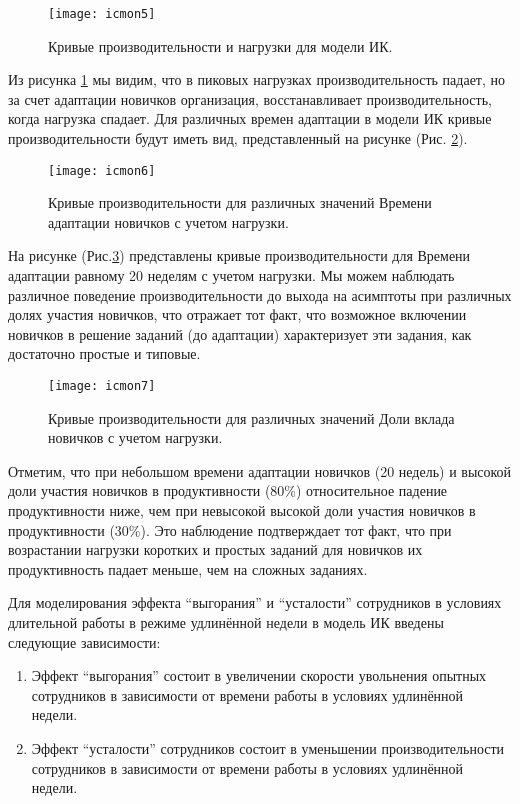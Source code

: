 \begin{figure}[H]
  \caption{Кривые производительности и нагрузки для модели ИК.}
  \centering
    \texttt{[image: icmon5]}
  \label{fig:icmon5}
\end{figure} 

Из рисунка \ref{fig:icmon5} мы видим, что в пиковых нагрузках производительность падает, но за счет адаптации новичков организация, восстанавливает производительность, когда нагрузка спадает. 
Для различных времен адаптации в модели ИК кривые производительности будут иметь вид, представленный на рисунке (Рис. \ref{fig:icmon6}).

\begin{figure}[H]
  \caption{Кривые производительности для различных значений Времени адаптации новичков с учетом нагрузки.}
  \centering
    \texttt{[image: icmon6]}
  \label{fig:icmon6}
\end{figure} 

На рисунке (Рис.\ref{fig:icmon7})  представлены кривые производительности для Времени адаптации равному 20 неделям с учетом нагрузки. 
Мы можем наблюдать различное поведение производительности до выхода на асимптоты при различных долях участия новичков, что отражает тот факт, что возможное включении новичков в решение заданий (до адаптации) характеризует эти задания, как достаточно простые и типовые.

\begin{figure}[H]
  \caption{Кривые производительности для различных значений Доли вклада новичков с учетом нагрузки.}
  \centering
    \texttt{[image: icmon7]}
  \label{fig:icmon7}
\end{figure} 

Отметим, что при небольшом времени адаптации новичков (20 недель) и высокой доли участия новичков в продуктивности (80\%) относительное падение продуктивности ниже, чем при невысокой высокой доли участия новичков в продуктивности (30\%). 
Это наблюдение подтверждает тот факт, что при возрастании нагрузки коротких и простых заданий для новичков их продуктивность падает меньше, чем на сложных заданиях.

Для моделирования эффекта ``выгорания'' и ``усталости'' сотрудников в условиях длительной работы в режиме удлинённой недели в модель ИК введены следующие зависимости: 
\begin{enumerate}
\tightlist
\item Эффект ``выгорания'' состоит в увеличении скорости увольнения опытных сотрудников в зависимости от времени работы в условиях удлинённой недели.
\item Эффект ``усталости'' сотрудников состоит в уменьшении производительности сотрудников в зависимости от времени работы в условиях удлинённой недели.
\end{enumerate}

